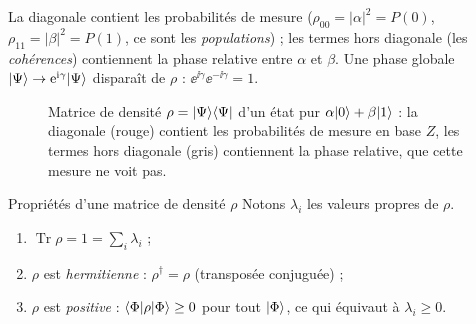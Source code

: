 La diagonale contient les probabilités de mesure ($\rho_{00}=|\alpha|^2=P(0)$,
$\rho_{11}=|\beta|^2=P(1)$, ce sont les \emph{populations}) ; les termes hors diagonale
(les \emph{cohérences}) contiennent la phase relative entre $\alpha$ et $\beta$.
Une phase globale $|\Psi\rangle\to\mathrm{e}^{\mathrm{i}\gamma}|\Psi\rangle$ disparaît de $\rho$ :
$\ee^{\ii\gamma}\ee^{-\ii\gamma}=1$.

\begin{figure}[!ht]
\centering
{}
\caption{Matrice de densité $\rho=|\Psi\rangle\langle \Psi|$ d'un état pur $\alpha|0\rangle+\beta|1\rangle$ : la
diagonale (rouge) contient les probabilités de mesure en base $Z$, les termes hors diagonale (gris)
contiennent la phase relative, que cette mesure ne voit pas.}
\label{fig:rho}
\end{figure}

\begin{resultat}{Propriétés d'une matrice de densité $\rho$}
Notons $\lambda_i$ les valeurs propres de $\rho$.
\begin{enumerate}[nosep]
  \item $\operatorname{Tr}\rho=1=\displaystyle\sum_i\lambda_i$ ;
  \item $\rho$ est \emph{hermitienne} : $\rho^\dagger=\rho$ (transposée conjuguée) ;
  \item $\rho$ est \emph{positive} : $\langle \Phi|\rho|\Phi\rangle\geq0$ pour tout
        $|\Phi\rangle$, ce qui équivaut à $\lambda_i\geq0$.
\end{enumerate}
\end{resultat}

